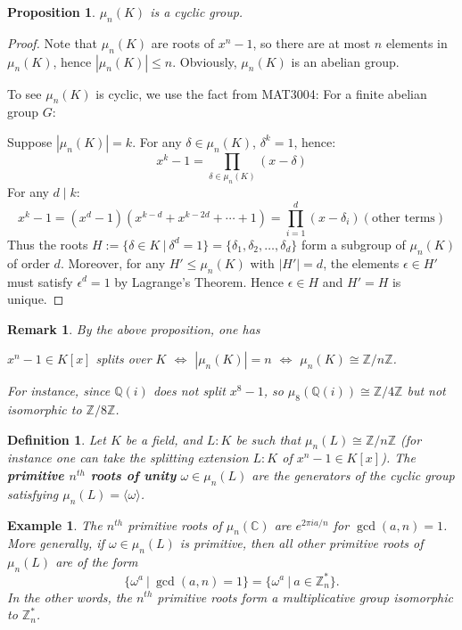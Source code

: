 \documentclass[11pt]{book}
\newtheorem{definition}[theorem]{Definition}
\newtheorem{example}[theorem]{Example}
\newtheorem{proposition}[theorem]{Proposition}
\newtheorem{remark}[theorem]{Remark}
\begin{document}
\begin{proposition}
    $\mu_n(K)$ is a cyclic group.
\end{proposition}
\begin{proof}
Note that $\mu_n(K)$ are roots of $x^n - 1$, so there are at most $n$ elements in $\mu_n(K)$, hence $|\mu_n(K)| \leq n$. Obviously, $\mu_n(K)$ is an abelian group.

To see $\mu_n(K)$ is cyclic, we use the fact from MAT3004: For a finite abelian group $G$:
\begin{center}
\end{center}


Suppose $|\mu_n(K)| = k$. For any $\delta \in \mu_n(K)$, $\delta^k = 1$, hence:
$$
x^k - 1 = \prod_{\delta \in \mu_n(K)} (x - \delta)
$$
For any $d \mid k$:
$$
x^k - 1 = (x^d - 1)(x^{k-d} + x^{k-2d} + \cdots + 1)=\prod_{i=1}^{d}(x-\delta_i)(\text{other terms})
$$
Thus the roots $H :=\{\delta\in K\ |\  \delta^d=1 \} = \{\delta_1, \delta_2, \ldots, \delta_d\}$ form a subgroup of $\mu_n(K)$ of order $d$. Moreover, for any $H' \leq \mu_n(K)$ with $|H'| =d$, the elements $\epsilon \in H'$ must satisfy $\epsilon^d = 1$ by Lagrange's Theorem. Hence $\epsilon \in H$ and $H' = H$ is unique.\qedhere
\end{proof}

\begin{remark}
By the above proposition, one has 
\begin{center}
$ x^n - 1 \in K[x]$ splits over $K$ \quad $\Leftrightarrow$ \quad $|\mu_n(K)| = n$ \quad $\Leftrightarrow$ \quad $\mu_n(K) \cong \mathbb{Z}/n\mathbb{Z}$.    
\end{center}
For instance, since $ \mathbb{Q}(i) $ does \emph{not} split $ x^8 - 1 $, so
$
\mu_8(\mathbb{Q}(i)) \cong \mathbb{Z}/4\mathbb{Z}$ but not isomorphic to $\mathbb{Z}/8\mathbb{Z}
$.
\end{remark}

\begin{definition}
Let $K$ be a field, and $L:K$ be such that $\mu_n(L) \cong \mathbb{Z}/n\mathbb{Z}$ (for instance one can take the splitting extension $L:K$ of $x^n-1 \in K[x]$). The {\bf primitive $n^{th}$ roots of unity} $\omega \in \mu_n(L)$ are the generators of the cyclic group satisfying $\mu_n(L) = \langle \omega \rangle$.
\end{definition}

\begin{example} \label{eg-primroots}
    The $n^{th}$ primitive roots of $\mu_n(\mathbb{C})$ are $e^{2\pi i a/n}$ for $\gcd(a,n) = 1$.
    More generally, if $\omega \in \mu_n(L)$ is primitive, then all other primitive roots of $\mu_n(L)$ are of the form
    $$\{\omega^a\ |\ \gcd(a,n) = 1\} = \{\omega^a\ |\ a \in \mathbb{Z}_n^*\}.$$
    In the other words, the $n^{th}$ primitive roots form a multiplicative group isomorphic to $\mathbb{Z}_n^*$.
\end{example}
\end{document}
